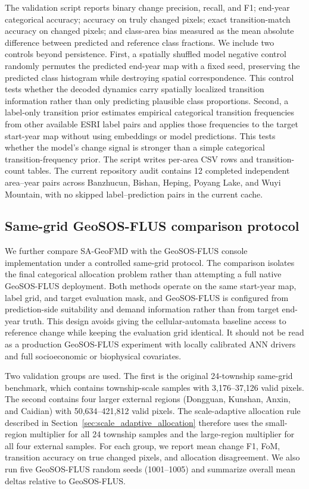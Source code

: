 \documentclass{article}
\begin{document}
The validation script reports binary change precision, recall, and F1; end-year categorical accuracy; accuracy on truly changed pixels; exact transition-match accuracy on changed pixels; and class-area bias measured as the mean absolute difference between predicted and reference class fractions. We include two controls beyond persistence. First, a spatially shuffled model negative control randomly permutes the predicted end-year map with a fixed seed, preserving the predicted class histogram while destroying spatial correspondence. This control tests whether the decoded dynamics carry spatially localized transition information rather than only predicting plausible class proportions. Second, a label-only transition prior estimates empirical categorical transition frequencies from other available ESRI label pairs and applies those frequencies to the target start-year map without using embeddings or model predictions. This tests whether the model's change signal is stronger than a simple categorical transition-frequency prior. The script writes per-area CSV rows and transition-count tables. The current repository audit contains 12 completed independent area--year pairs across Banzhucun, Bishan, Heping, Poyang Lake, and Wuyi Mountain, with no skipped label--prediction pairs in the current cache.

\subsection{Same-grid GeoSOS-FLUS comparison protocol}
\label{sec:geosos_flus_protocol}

We further compare SA-GeoFMD with the GeoSOS-FLUS console implementation under a controlled same-grid protocol. The comparison isolates the final categorical allocation problem rather than attempting a full native GeoSOS-FLUS deployment. Both methods operate on the same start-year map, label grid, and target evaluation mask, and GeoSOS-FLUS is configured from prediction-side suitability and demand information rather than from target end-year truth. This design avoids giving the cellular-automata baseline access to reference change while keeping the evaluation grid identical. It should not be read as a production GeoSOS-FLUS experiment with locally calibrated ANN drivers and full socioeconomic or biophysical covariates.

Two validation groups are used. The first is the original 24-township same-grid benchmark, which contains township-scale samples with 3,176--37,126 valid pixels. The second contains four larger external regions (Dongguan, Kunshan, Anxin, and Caidian) with 50,634--421,812 valid pixels. The scale-adaptive allocation rule described in Section~\ref{sec:scale_adaptive_allocation} therefore uses the small-region multiplier for all 24 township samples and the large-region multiplier for all four external samples. For each group, we report mean change F1, FoM, transition accuracy on true changed pixels, and allocation disagreement. We also run five GeoSOS-FLUS random seeds (1001--1005) and summarize overall mean deltas relative to GeoSOS-FLUS.
\end{document}
